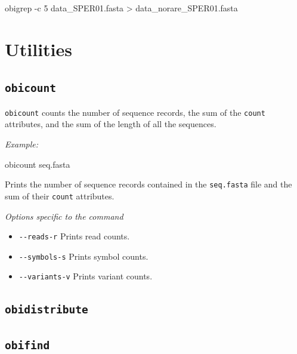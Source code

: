 \documentclass[
  letterpaper,
  DIV=11,
  numbers=noendperiod]{scrreprt}
\newenvironment{Shaded}{\begin{snugshade}}{\end{snugshade}}
\newcommand{\AttributeTok}[1]{\textcolor[rgb]{0.40,0.45,0.13}{#1}}
\newcommand{\ExtensionTok}[1]{\textcolor[rgb]{0.00,0.23,0.31}{#1}}
\newcommand{\NormalTok}[1]{\textcolor[rgb]{0.00,0.23,0.31}{#1}}
\newcommand{\OperatorTok}[1]{\textcolor[rgb]{0.37,0.37,0.37}{#1}}
\providecommand{\tightlist}{%
  \setlength{\itemsep}{0pt}\setlength{\parskip}{0pt}}\usepackage{longtable,booktabs,array}
\begin{document}
\begin{Shaded}
\begin{Highlighting}[]
\ExtensionTok{obigrep} \AttributeTok{{-}c}\NormalTok{ 5 data\_SPER01.fasta }\OperatorTok{\textgreater{}}\NormalTok{ data\_norare\_SPER01.fasta}
\end{Highlighting}
\end{Shaded}

\hypertarget{utilities}{%
\chapter{Utilities}\label{utilities}}

\hypertarget{obicount}{%
\section{\texorpdfstring{\texttt{obicount}}{obicount}}\label{obicount}}

\texttt{obicount} counts the number of sequence records, the sum of the
\texttt{count} attributes, and the sum of the length of all the
sequences.

\emph{Example:}

\begin{Shaded}
\begin{Highlighting}[]
\ExtensionTok{obicount}\NormalTok{ seq.fasta  }
\end{Highlighting}
\end{Shaded}

Prints the number of sequence records contained in the
\texttt{seq.fasta} file and the sum of their \texttt{count} attributes.

\emph{Options specific to the command}

\begin{itemize}
\tightlist
\item
  \texttt{-\/-reads\textbar{}-r} Prints read counts.
\item
  \texttt{-\/-symbols\textbar{}-s} Prints symbol counts.
\item
  \texttt{-\/-variants\textbar{}-v} Prints variant counts.
\end{itemize}

\hypertarget{obidistribute}{%
\section{\texorpdfstring{\texttt{obidistribute}}{obidistribute}}\label{obidistribute}}

\hypertarget{obifind}{%
\section{\texorpdfstring{\texttt{obifind}}{obifind}}\label{obifind}}
\end{document}
